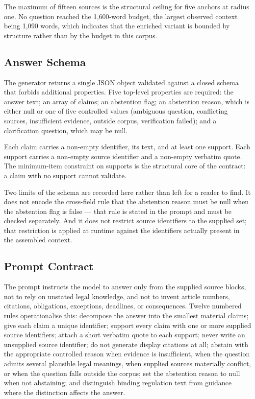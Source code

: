 The maximum of fifteen sources is the structural ceiling for five anchors at radius one. No question reached the 1{,}600-word budget, the largest observed context being 1{,}090 words, which indicates that the enriched variant is bounded by structure rather than by the budget in this corpus.

\subsection{Answer Schema}

The generator returns a single JSON object validated against a closed schema that forbids additional properties. Five top-level properties are required: the answer text; an array of claims; an abstention flag; an abstention reason, which is either null or one of five controlled values (ambiguous question, conflicting sources, insufficient evidence, outside corpus, verification failed); and a clarification question, which may be null.

Each claim carries a non-empty identifier, its text, and at least one support. Each support carries a non-empty source identifier and a non-empty verbatim quote. The minimum-item constraint on supports is the structural core of the contract: a claim with no support cannot validate.

Two limits of the schema are recorded here rather than left for a reader to find. It does not encode the cross-field rule that the abstention reason must be null when the abstention flag is false --- that rule is stated in the prompt and must be checked separately. And it does not restrict source identifiers to the supplied set; that restriction is applied at runtime against the identifiers actually present in the assembled context.

\subsection{Prompt Contract}

The prompt instructs the model to answer only from the supplied source blocks, not to rely on unstated legal knowledge, and not to invent article numbers, citations, obligations, exceptions, deadlines, or consequences. Twelve numbered rules operationalise this: decompose the answer into the smallest material claims; give each claim a unique identifier; support every claim with one or more supplied source identifiers; attach a short verbatim quote to each support; never write an unsupplied source identifier; do not generate display citations at all; abstain with the appropriate controlled reason when evidence is insufficient, when the question admits several plausible legal meanings, when supplied sources materially conflict, or when the question falls outside the corpus; set the abstention reason to null when not abstaining; and distinguish binding regulation text from guidance where the distinction affects the answer.

